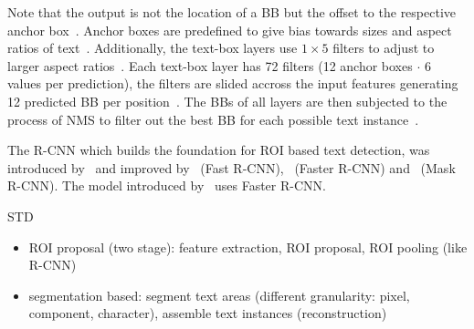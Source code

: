 Note that the output is not the location of a \ac{BB} but the offset to the
respective anchor box~\citep{liao_textboxes_2017}.
Anchor boxes are predefined to give bias towards sizes and aspect ratios of
text~\citep{liao_textboxes_2017}.
Additionally, the text-box layers use $1\times5$ filters to adjust to larger aspect
ratios~\citep{liao_textboxes_2017}.
Each text-box layer has 72 filters (12 anchor boxes $\cdot$ 6 values per prediction), the filters
are slided accross the input features generating 12 predicted \ac{BB} per
position~\citep{liao_textboxes_2017}.
The \acp{BB} of all layers are then subjected to the process of \ac{NMS} to filter out the best
\ac{BB} for each possible text instance~\citep{liao_textboxes_2017}.

The R-CNN which builds the foundation for \ac{ROI} based text detection, was introduced
by~\cite{girshick_rich_2014} and improved by~\cite{girshick_fast_2015} (Fast
R-CNN),~\cite{ren_faster_2015} (Faster R-CNN) and~\cite{he_mask_2018} (Mask R-CNN).
The model introduced by~\cite{jiang_r2cnn_2017} uses Faster R-CNN.

STD
\begin{itemize}
    \item ROI proposal (two stage): feature extraction, ROI proposal, ROI pooling
            (like R-CNN)
    \item segmentation based: segment text areas (different granularity: pixel, component,
        character), assemble text instances (reconstruction)
\end{itemize}

